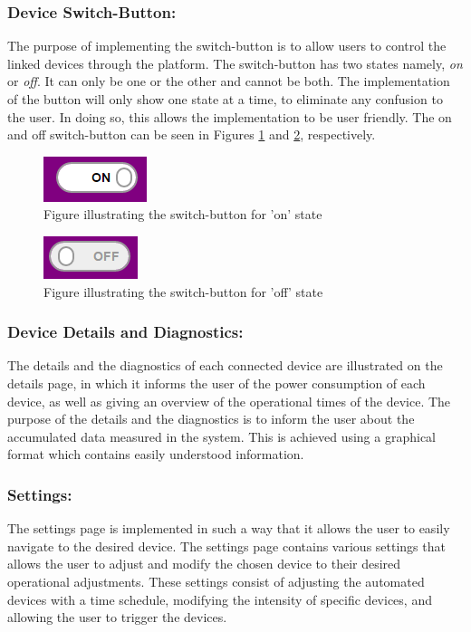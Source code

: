 \documentclass[10pt,twocolumn]{witseiepaper}
\begin{document}
	\subsubsection{Device Switch-Button:}
	The purpose of implementing the switch-button is to allow users to control the linked devices through the platform. The switch-button has two states namely, \textit{on} or \textit{off}. It can only be one or the other and cannot be both. The implementation of the button will only show one state at a time, to eliminate any confusion to the user. In doing so, this allows the implementation to be user friendly. The on and off switch-button can be seen in Figures \ref{on_switch_button} and  \ref{off_switch_button}, respectively.
	
	\begin{figure}[!h]
		\centering
		\includegraphics[scale=0.35]{switch_button.png}
		\caption{Figure illustrating the switch-button for 'on' state}
		\label{on_switch_button}
	\end{figure}
	
	\begin{figure}[!h]
		\centering
		\includegraphics[scale=0.35]{switch_button_off.png}
		\caption{Figure illustrating the switch-button for 'off' state}
		\label{off_switch_button}
	\end{figure}
	
	\subsubsection{Device Details and Diagnostics:}
	The details and the diagnostics of each connected device are illustrated on the details page, in which it informs the user of the power consumption of each device, as well as giving an overview of the operational times of the device. The purpose of the details and the diagnostics is to inform the user about the accumulated data measured in the system. This is achieved using a graphical format which contains easily understood information. 
	
	\subsubsection{Settings:}
	The settings page is implemented in such a way that it allows the user to easily navigate to the desired device. The settings page contains various settings that allows the user to adjust and modify the chosen device to their desired operational adjustments. These settings consist of adjusting the automated devices with a time schedule, modifying the intensity of specific devices, and allowing the user to trigger the devices. 
	
\end{document}
